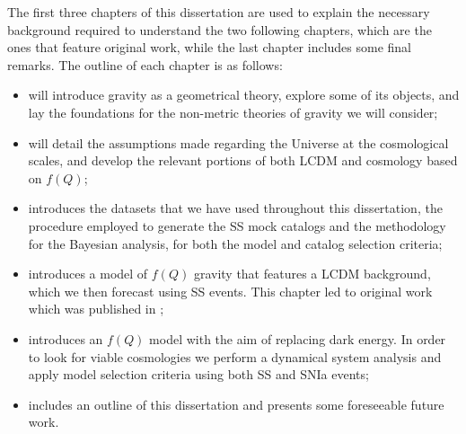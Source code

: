 The first three chapters of this dissertation are used to explain the necessary background required to understand the two following chapters, which are the ones that feature original work, while the last chapter includes some final remarks. The outline of each chapter is as follows:
\begin{itemize}
    \item {} will introduce gravity as a geometrical theory, explore some of its objects, and lay the foundations for the non-metric theories of gravity we will consider;
    \item {} will detail the assumptions made regarding the Universe at the cosmological scales, and develop the relevant portions of both \gls{LCDM} and cosmology based on $f(Q)$;
    \item {} introduces the datasets that we have used throughout this dissertation, the procedure employed to generate the \gls{SS} mock catalogs and the methodology for the Bayesian analysis, for both the model and catalog selection criteria;
    \item {} introduces a model of $f(Q)$ gravity that features a \gls{LCDM} background, which we then forecast using \gls{SS} events. This chapter led to original work which was published in \cite{Ferreira2022};
    \item {} introduces an $f(Q)$ model with the aim of replacing dark energy. In order to look for viable cosmologies we perform a dynamical system analysis and apply model selection criteria using both \gls{SS} and \gls{SNIa} events;
    \item {} includes an outline of this dissertation and presents some foreseeable future work.
\end{itemize}
